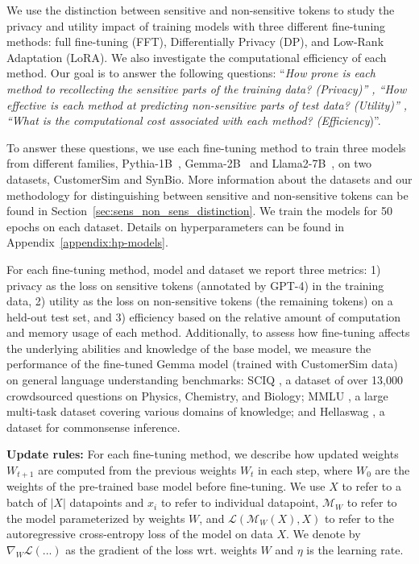 We use the distinction between sensitive and non-sensitive tokens to study the privacy and utility impact of training models with three different fine-tuning methods: full fine-tuning (FFT), Differentially Privacy (DP), and Low-Rank Adaptation (LoRA).
We also investigate the computational efficiency of each method.
Our goal is to answer the following questions: ``\textit{How prone is each method to recollecting the sensitive parts of the training data? (Privacy)'' , ``How effective is each method at predicting non-sensitive parts of test data? (Utility)'' , ``What is the computational cost associated with each method? (Efficiency})''.

To answer these questions, we use each fine-tuning method to train three models from different families, Pythia-1B~\cite{biderman2023pythia}, Gemma-2B~\cite{team2024gemma} and Llama2-7B~\cite{touvron2023llama}, on two datasets, CustomerSim and SynBio.
More information about the datasets and our methodology for distinguishing between sensitive and non-sensitive tokens can be found in Section~\ref{sec:sens_non_sens_distinction}.
We train the models for 50 epochs on each dataset.
Details on hyperparameters can be found in Appendix~\ref{appendix:hp-models}.

For each fine-tuning method, model and dataset we report three metrics: 1) privacy as the loss on sensitive tokens (annotated by GPT-4) in the training data, 2) utility as the loss on non-sensitive tokens (the remaining tokens) on a held-out test set, and 3) efficiency based on the relative amount of computation and memory usage of each method.
Additionally, to assess how fine-tuning affects the underlying abilities and knowledge of the base model, we measure the performance of the fine-tuned Gemma model (trained with CustomerSim data) on general language understanding benchmarks: SCIQ \cite{SciQ}, a dataset of over 13,000 crowdsourced questions on Physics, Chemistry, and Biology; MMLU \cite{hendryckstest2021, hendrycks2021ethics}, a large multi-task dataset covering various domains of knowledge; and Hellaswag \cite{zellers-etal-2019-hellaswag}, a dataset for commonsense inference.

\noindent
\textbf{Update rules:}
For each fine-tuning method, we describe how updated weights $W_{t + 1}$ are computed from the previous weights $W_t$ in each step, where $W_0$ are the weights of the pre-trained base model before fine-tuning.
We use $X$ to refer to a batch of $|X|$ datapoints and $x_i$ to refer to individual datapoint, $\mathcal{M}_{W}$ to refer to the model parameterized by weights $W$, and $\mathcal{L}(\mathcal{M}_{W}(X), X)$ to refer to the autoregressive cross-entropy loss of the model on data $X$.
We denote by $\nabla_{W} \mathcal{L}(...)$ as the gradient of the loss wrt. weights $W$ and $\eta$ is the learning rate.

